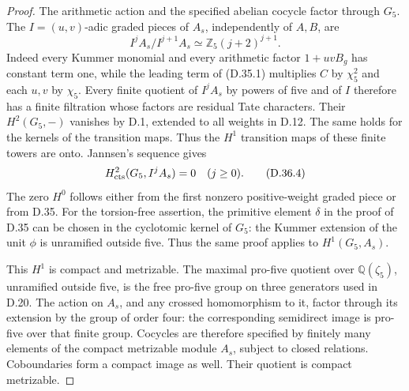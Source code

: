 \begin{proof}
The arithmetic action and the specified
abelian cocycle factor through \(G_5\).
The \(I=(u,v)\)-adic graded pieces of
\(A_s\), independently of \(A,B\), are
\[
             I^jA_s/I^{j+1}A_s
                  \simeq\mathbb Z_5(j+2)^{j+1}.
                                                        \tag{D.36.3}
\]
Indeed every Kummer monomial and every
arithmetic factor \(1+uvB_g\) has
constant term one, while the leading
term of (D.35.1) multiplies \(C\) by
\(\chi_5^2\) and each \(u,v\) by
\(\chi_5\). Every finite quotient
of \(I^jA_s\) by powers of five and
of \(I\) therefore has a finite
filtration whose factors are residual
Tate characters. Their \(H^2(G_5,-)\)
vanishes by D.1, extended to all
weights in D.12. The same holds for
the kernels of the transition maps.
Thus the \(H^1\) transition maps of
these finite towers are onto.
Jannsen's sequence gives
\[
          H^2_{\rm cts}(G_5,I^jA_s)=0
                   \quad(j\ge0).
                                                        \tag{D.36.4}
\]
The zero \(H^0\) follows either from
the first nonzero positive-weight
graded piece or from D.35.
For the torsion-free assertion, the
primitive element \(\delta\) in the
proof of D.35 can be chosen in the
cyclotomic kernel of \(G_5\):
the Kummer extension of the unit
\(\phi\) is unramified outside five.
Thus the same proof applies to
\(H^1(G_5,A_s)\).

This \(H^1\) is compact and metrizable.
The maximal pro-five quotient over
\(\mathbb Q(\zeta_5)\), unramified
outside five, is the free pro-five
group on three generators used in
D.20. The action on \(A_s\), and
any crossed homomorphism to it,
factor through its extension by
the group of order four: the
corresponding semidirect image is
pro-five over that finite group.
Cocycles are therefore specified by
finitely many elements of the compact
metrizable module \(A_s\), subject
to closed relations. Coboundaries
form a compact image as well.
Their quotient is compact metrizable.


\end{proof}

